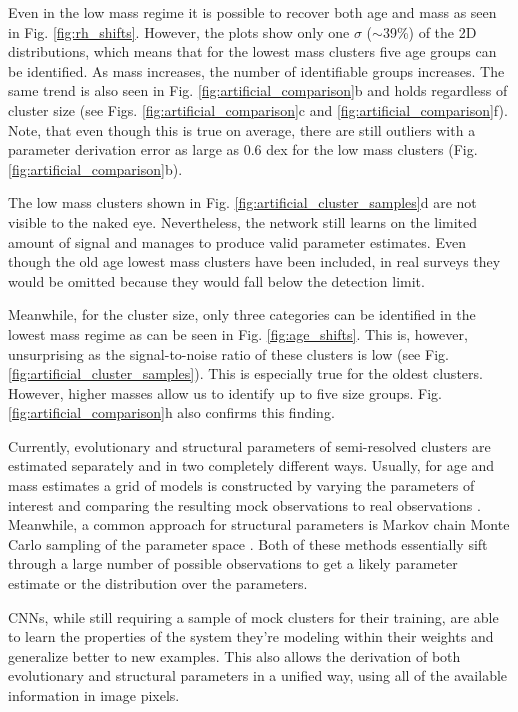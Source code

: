 \documentclass{aa}
\begin{document}
Even in the low mass regime it is possible to recover both age and mass as seen in Fig. \ref{fig:rh_shifts}. However, the plots show only one $\sigma$ ($\sim$39\%) of the 2D distributions, which means that for the lowest mass clusters five age groups can be identified. As mass increases, the number of identifiable groups increases. The same trend is also seen in Fig. \ref{fig:artificial_comparison}b and holds regardless of cluster size (see Figs. \ref{fig:artificial_comparison}c and \ref{fig:artificial_comparison}f). Note, that even though this is true on average, there are still outliers with a parameter derivation error as large as 0.6 dex for the low mass clusters (Fig. \ref{fig:artificial_comparison}b).

The low mass clusters shown in Fig. \ref{fig:artificial_cluster_samples}d are not visible to the naked eye. Nevertheless, the network still learns on the limited amount of signal and manages to produce valid parameter estimates. Even though the old age lowest mass clusters have been included, in real surveys they would be omitted because they would fall below the detection limit.

Meanwhile, for the cluster size, only three categories can be identified in the lowest mass regime as can be seen in Fig. \ref{fig:age_shifts}. This is, however, unsurprising as the signal-to-noise ratio of these clusters is low (see Fig. \ref{fig:artificial_cluster_samples}). This is especially true for the oldest clusters. However, higher masses allow us to identify up to five size groups. Fig. \ref{fig:artificial_comparison}h also confirms this finding.

Currently, evolutionary and structural parameters of semi-resolved clusters are estimated separately and in two completely different ways. Usually, for age and mass estimates a grid of models is constructed by varying the parameters of interest and comparing the resulting mock observations to real observations \citep{2008BaltA..17..337B, 2013A&A...550A..20D}. Meanwhile, a common approach for structural parameters is Markov chain Monte Carlo sampling of the parameter space \citep{2015BaltA..24..305N}. Both of these methods essentially sift through a large number of possible observations to get a likely parameter estimate or the distribution over the parameters.

CNNs, while still requiring a sample of mock clusters for their training, are able to learn the properties of the system they're modeling within their weights and generalize better to new examples. This also allows the derivation of both evolutionary and structural parameters in a unified way, using all of the available information in image pixels.
\end{document}

